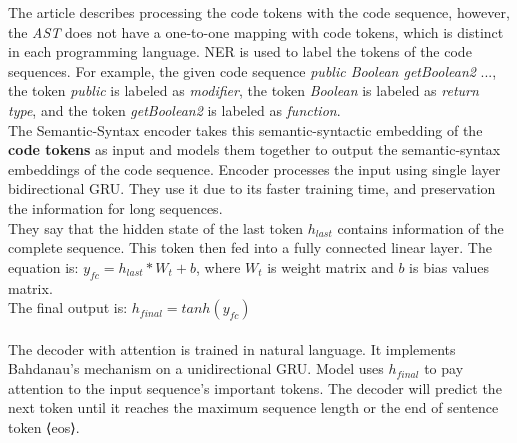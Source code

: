 \documentclass{article}
\begin{document}
The article describes processing the code tokens with the code sequence, however, the \textit{AST} does not have a one-to-one mapping with code tokens, which is distinct in each programming language. NER is used to label the tokens of the code sequences. For example, the given code sequence \textit{public Boolean getBoolean2} ..., the token \textit{public} is labeled as \textit{modifier}, the token \textit{Boolean} is labeled as \textit{return type}, and the token \textit{getBoolean2} is labeled as \textit{function}.\\


The Semantic-Syntax encoder takes this semantic-syntactic embedding of the \textbf{code tokens} as input and models them together to output the semantic-syntax embeddings of the code sequence. Encoder processes the input using single layer bidirectional GRU. They use it due to its faster training time, and preservation the information for long sequences. \\ They say that the hidden state of the last token $h_{last}$ contains information of the complete sequence. This token then fed into a fully connected linear layer. The equation is: $y_{fc} = h_{last} * W_t + b$, where $W_t$ is weight matrix and $b$ is bias values matrix. \\
The final output is: $h_{final}=tanh(y_{fc})$ \\\\
The decoder with attention is trained in natural language. It implements Bahdanau’s mechanism on a unidirectional GRU. Model uses $h_{final}$ to
pay attention to the input sequence’s important tokens. The decoder will predict the next token until it reaches the maximum sequence length or the end of sentence token ⟨eos⟩.
\end{document}

